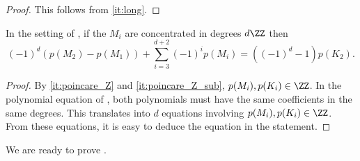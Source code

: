 \documentclass[a4paper]{amsart}
\begin{document}
\begin{proof}
  This follows from  \eqref{it:long}.
\end{proof}

\begin{corollary}
  \label{cor:poincare}
  In the setting of , if the $M_i$ are concentrated in degrees $d\ZZ$ then 
  \[(-1)^d\left(p(M_2)-p(M_1)\right)+\sum_{i=3}^{d+2}(-1)^ip(M_i)=\left((-1)^d-1\right)p(K_2).\]
\end{corollary}

\begin{proof}
  By  \eqref{it:poincare_Z} and \eqref{it:poincare_Z_sub}, $p(M_i),p(K_i)\in\ZZ$. In the polynomial equation of , both polynomials must have the same coefficients in the same degrees. This translates into $d$ equations involving $p(M_i),p(K_i)\in\ZZ$. From these equations, it is easy to deduce the equation in the statement.
\end{proof}

We are ready to prove .
\end{document}
